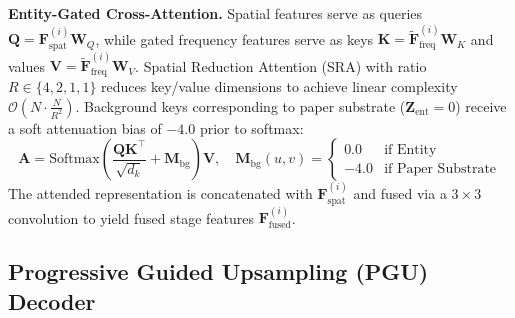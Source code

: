 \documentclass[10pt,twocolumn,letterpaper]{article}
\begin{document}
\noindent\textbf{Entity-Gated Cross-Attention.}
Spatial features serve as queries $\mathbf{Q} = \mathbf{F}_{\text{spat}}^{(i)} \mathbf{W}_Q$, while gated frequency features serve as keys $\mathbf{K} = \tilde{\mathbf{F}}_{\text{freq}}^{(i)} \mathbf{W}_K$ and values $\mathbf{V} = \tilde{\mathbf{F}}_{\text{freq}}^{(i)} \mathbf{W}_V$. Spatial Reduction Attention (SRA) with ratio $R \in \{4, 2, 1, 1\}$ reduces key/value dimensions to achieve linear complexity $\mathcal{O}(N \cdot \frac{N}{R^2})$. Background keys corresponding to paper substrate ($\mathbf{Z}_{\text{ent}} = 0$) receive a soft attenuation bias of $-4.0$ prior to softmax:
\begin{equation}
    \mathbf{A} = \text{Softmax}\left( \frac{\mathbf{Q} \mathbf{K}^\top}{\sqrt{d_k}} + \mathbf{M}_{\text{bg}} \right) \mathbf{V}, \quad \mathbf{M}_{\text{bg}}(u, v) = \begin{cases} 0.0 & \text{if Entity} \\ -4.0 & \text{if Paper Substrate} \end{cases}
\end{equation}
The attended representation is concatenated with $\mathbf{F}_{\text{spat}}^{(i)}$ and fused via a $3 \times 3$ convolution to yield fused stage features $\mathbf{F}_{\text{fused}}^{(i)}$.

\subsection{Progressive Guided Upsampling (PGU) Decoder}
\label{subsec:pgu_decoder}
\end{document}

